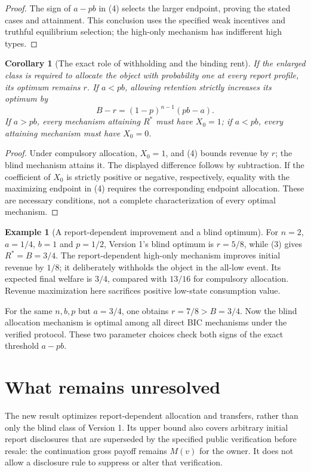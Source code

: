 \documentclass[11pt]{article}
\newtheorem{corollary}[theorem]{Corollary}
\theoremstyle{definition}
\newtheorem{example}[theorem]{Example}
\theoremstyle{remark}
\begin{document}
\begin{proof}
The sign of $a-pb$ in (4) selects the larger endpoint, proving the
stated cases and attainment. This conclusion uses the specified weak
incentives and truthful equilibrium selection; the high-only mechanism
has indifferent high types.
\end{proof}

\begin{corollary}[The exact role of withholding and the binding rent]
If the enlarged class is required to allocate the object with probability
one at every report profile, its optimum remains $r$. If $a<pb$,
allowing retention strictly increases its optimum by
\[
 B-r=(1-p)^{n-1}(pb-a).
\]
If $a>pb$, every mechanism attaining $R^*$ must have $X_0=1$;
if $a<pb$, every attaining mechanism must have $X_0=0$.
\end{corollary}
\begin{proof}
Under compulsory allocation, $X_0=1$, and (4) bounds revenue by $r$;
the blind mechanism attains it. The displayed difference follows by
subtraction. If the coefficient of $X_0$ is strictly positive or
negative, respectively, equality with the maximizing endpoint in (4)
requires the corresponding endpoint allocation. These are necessary
conditions, not a complete characterization of every optimal mechanism.
\end{proof}

\begin{example}[A report-dependent improvement and a blind optimum]
For $n=2$, $a=1/4$, $b=1$ and $p=1/2$, Version 1's blind optimum
is $r=5/8$, while (3) gives $R^*=B=3/4$. The report-dependent
high-only mechanism improves initial revenue by $1/8$; it deliberately
withholds the object in the all-low event. Its expected final welfare
is $3/4$, compared with $13/16$ for compulsory allocation. Revenue
maximization here sacrifices positive low-state consumption value.

For the same $n,b,p$ but $a=3/4$, one obtains $r=7/8>B=3/4$.
Now the blind allocation mechanism is optimal among all direct BIC
mechanisms under the verified protocol. These two parameter choices
check both signs of the exact threshold $a-pb$.
\end{example}

\section{What remains unresolved}
The new result optimizes report-dependent allocation and transfers,
rather than only the blind class of Version 1. Its upper bound also
covers arbitrary initial report disclosures that are superseded by the
specified public verification before resale: the continuation gross
payoff remains $M(v)$ for the owner. It does not allow a disclosure
rule to suppress or alter that verification.
\end{document}
